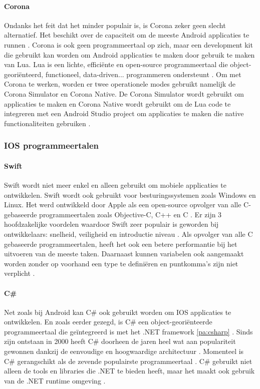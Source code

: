 \paragraph{Corona}
Ondanks het feit dat het minder populair is, is Corona zeker geen slecht alternatief. 
Het beschikt over de capaciteit om de meeste Android applicaties te runnen
\autocite{Kesavan2021}. Corona is ook geen programmeertaal op zich, maar een development kit 
die gebruikt kan worden om Android applicaties te maken door gebruik te maken van Lua. Lua is 
een lichte, efficiënte en open-source programmeertaal die object-georiënteerd, functioneel, 
data-driven... programmeren ondersteunt \autocite{Lua2021}. Om met Corona te werken, worden 
er twee operationele modes gebruikt namelijk de Corona Simulator en Corona Native. De Corona 
Simulator wordt gebruikt om applicaties te maken en Corona Native wordt gebruikt om de Lua 
code te integreren met een Android Studio project om applicaties te maken die native 
functionaliteiten gebruiken \autocite{harkiran2022}.

\subsubsection{IOS programmeertalen}
\paragraph{Swift}
Swift wordt niet meer enkel en alleen gebruikt om mobiele applicaties te ontwikkelen. 
Swift wordt ook gebruikt voor besturingssystemen zoals Windows en Linux. Het werd 
ontwikkeld door Apple als een open-source opvolger van alle C-gebaseerde programmeertalen 
zoals Objective-C, C++ en C \autocite{Coursera2022}. Er zijn 3 hoofdzakelijke voordelen 
waardoor Swift zeer populair is geworden bij ontwikkelaars: snelheid, veiligheid en 
introductie niveau \autocite{yuvraj2022}. Als opvolger van alle C gebaseerde programmeertalen, 
heeft het ook een betere performantie bij het uitvoeren van de meeste taken. Daarnaast kunnen 
variabelen ook aangemaakt worden zonder op voorhand een type te definiëren en puntkomma's 
zijn niet verplicht \autocite{Thorndyke2021}.

\paragraph{C\#}
Net zoals bij Android kan C\# ook gebruikt worden om IOS applicaties te ontwikkelen. 
En zoals eerder gezegd, is C\# een object-georiënteerde programmeertaal die geïntegreerd 
is met het .NET framework \ref{pa:csharp} \autocite{yuvraj2022}. Sinds zijn ontstaan in 
2000 heeft C\# doorheen de jaren heel wat aan populariteit gewonnen dankzij de 
eenvoudige en hoogwaardige architectuur \autocite{yuvraj2022}. Momenteel is C\# gerangschikt 
als de zevende populairste programmeertaal \autocite{Johns2023}. C\# gebruikt niet alleen de 
tools en libraries die .NET te bieden heeft, maar het maakt ook gebruik van de .NET runtime 
omgeving \autocite{Pruciak2022}.

